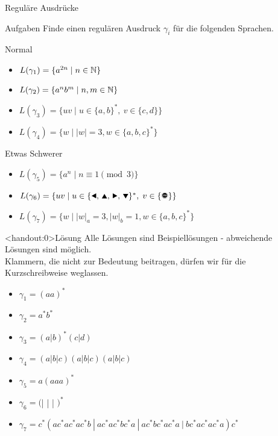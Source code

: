 {
\begin{frame}{Reguläre Ausdrücke}
    \begin{alertblock}{Aufgaben}
        Finde einen regulären Ausdruck $\gamma_i$ für die folgenden Sprachen.
    \end{alertblock}
    \begin{block}{Normal}
        \begin{itemize}
            \item $L(\gamma_1) = \{a^{2n} \mid n\in\mathbb{N}\}$
            \item $L(\gamma_2) = \{a^nb^m \mid n, m\in\mathbb{N}\}$
            \item $L(\gamma_3) = \{uv \mid u\in\{a,b\}^\ast,\ v\in\{c,d\}\}$
            \item $L(\gamma_4) = \{w \mid |w| = 3, w\in \{a,b,c\}^*\}$
        \end{itemize}
    \end{block}
    \begin{block}{Etwas Schwerer}
        \begin{itemize}
            \item $L(\gamma_5) = \{a^n \mid n \equiv 1 \pmod 3\}$
            \item $L(\gamma_6) = \{uv\mid u\in\{\text{\Rewind, \MoveUp, \Forward, \MoveDown}\}^\ast,\;v\in\{\text{\Stopsign}\}\}$
            \item $L(\gamma_7) = \{w \mid |w|_a = 3, |w|_b = 1, w\in \{a,b,c\}^*\}$
        \end{itemize}
    \end{block}
\end{frame}
}

{
\begin{frame}<handout:0>{Lösung}
    Alle Lösungen sind Beispiellösungen - abweichende Lösungen sind möglich.\\
    Klammern, die nicht zur Bedeutung beitragen, dürfen wir für die Kurzschreibweise weglassen.
    \begin{itemize}[<+- | alert@+>]
        \item $\gamma_1 = (aa)^*$
        \item $\gamma_2 = a^*b^*$
        \item $\gamma_3 = (a|b)^*(c|d)$
        \item $\gamma_4 = (a|b|c)(a|b|c)(a|b|c)$
        \item $\gamma_5 = a(aaa)^*$
        \item $\gamma_6 = ($\Rewind | \MoveUp | \Forward | \MoveDown$)^*$\Stopsign
        \item $\gamma_7 = c^*(ac^*ac^*ac^*b\ |\ ac^*ac^*bc^*a\ |\ ac^*bc^*ac^*a\ |\ bc^*ac^*ac^*a)c^*$
    \end{itemize}
\end{frame}
}

